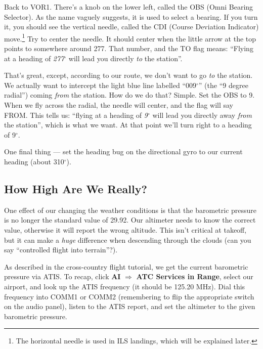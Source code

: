 

Back to VOR1.  There's a knob on the lower left, called the OBS (Omni
Bearing Selector).  As the name vaguely suggests, it is used to select
a bearing.  If you turn it, you should see the vertical needle, called
the CDI (Course Deviation Indicator) move.\footnote{The horizontal
  needle is used in ILS landings, which will be explained later.}  Try
to center the needle.  It should center when the little arrow at the
top points to somewhere around 277.  That number, and the TO flag
means: ``Flying at a heading of \emph{277$^\circ$} will lead you
directly \emph{to} the station''.

That's great, except, according to our route, we don't want to go
\emph{to} the station.  We actually want to intercept the light blue
line labelled ``009$^\circ$'' (the ``9 degree radial'') coming
\emph{from} the station.  How do we do that?  Simple.  Set the OBS to
9.  When we fly across
the radial, the needle will center, and the flag will say FROM.  This
tells us: ``flying at a heading of \emph{9$^\circ$} will lead you
directly away \emph{from} the station'', which is what we want.  At
that point we'll turn right to a heading of 9$^\circ$.

One final thing --- set the heading bug on the directional gyro to our
current heading (about 310$^\circ$).

\subsection{How High Are We Really?}

One effect of our changing the weather conditions is that the
barometric pressure is no longer the standard value of 29.92.  Our
altimeter needs to know the correct value, otherwise it will report
the wrong altitude.  This isn't critical at takeoff, but it can make a
\emph{huge} difference when descending through the clouds (can you say
``controlled flight into terrain''?).

As described in the cross-country flight tutorial, we get the current
barometric pressure via ATIS.  To recap, click \textbf{\textsf{AI}}
$\Rightarrow$ \textbf{\textsf{ATC Services in Range}}, select our
airport, and look up the ATIS frequency (it should be 125.20 MHz).
Dial this frequency into COMM1 or COMM2 (remembering to flip the
appropriate switch on the audio panel), listen to the ATIS report, and
set the altimeter to the given barometric pressure.

